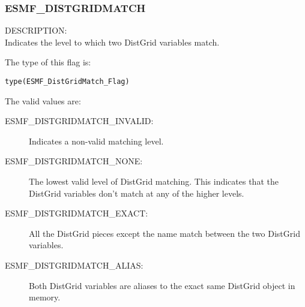 

\subsubsection{ESMF\_DISTGRIDMATCH}
\label{const:distgridmatch}

{\sf DESCRIPTION:\\}
Indicates the level to which two DistGrid variables match.

The type of this flag is:

{\tt type(ESMF\_DistGridMatch\_Flag)}

The valid values are:
\begin{description}
\item [ESMF\_DISTGRIDMATCH\_INVALID:] Indicates a non-valid matching level.
\item [ESMF\_DISTGRIDMATCH\_NONE:] The lowest valid level of DistGrid matching. 
  This indicates that the DistGrid variables don't match at any of the higher
  levels.
\item [ESMF\_DISTGRIDMATCH\_EXACT:] All the DistGrid pieces except the name
  match between the two DistGrid variables. 
\item [ESMF\_DISTGRIDMATCH\_ALIAS:] Both DistGrid variables are aliases to the
  exact same DistGrid object in memory.
\end{description}

